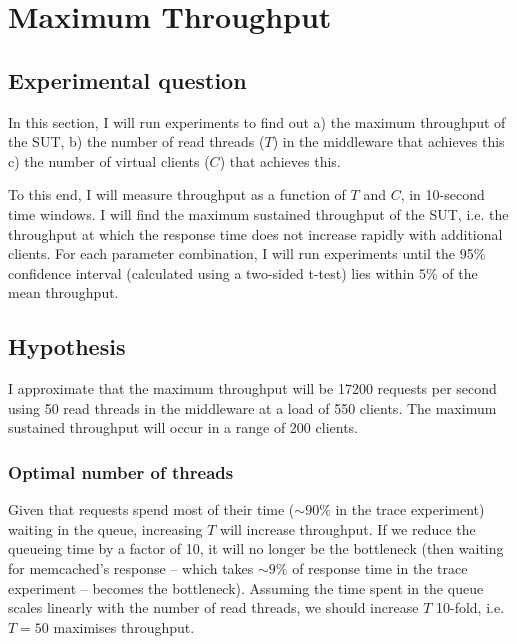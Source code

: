 \documentclass[11pt]{article}
\begin{document}
\clearpage
\section{Maximum Throughput}
\label{sec:exp1}

\subsection{Experimental question}

In this section, I will run experiments to find out a) the maximum throughput of the SUT, b) the number of read threads ($T$) in the middleware that achieves this c) the number of virtual clients ($C$) that achieves this.

To this end, I will measure throughput as a function of $T$ and $C$, in 10-second time windows. I will find the maximum sustained throughput of the SUT, i.e. the throughput at which the response time does not increase rapidly with additional clients. For each parameter combination, I will run experiments until the 95\% confidence interval (calculated using a two-sided t-test) lies within 5\% of the mean throughput.

\subsection{Hypothesis}

I approximate that the maximum throughput will be 17200 requests per second using 50 read threads in the middleware at a load of 550 clients. The maximum sustained throughput will occur in a range of 200 clients.

\subsubsection{Optimal number of threads} 
Given that requests spend most of their time ($\sim90\%$ in the trace experiment) waiting in the queue, increasing $T$ will increase throughput. If we reduce the queueing time by a factor of 10, it will no longer be the bottleneck (then waiting for memcached's response -- which takes $\sim9\%$ of response time in the trace experiment -- becomes the bottleneck). Assuming the time spent in the queue scales linearly with the number of read threads, we should increase $T$ 10-fold, i.e. $T=50$ maximises throughput.
\end{document}

